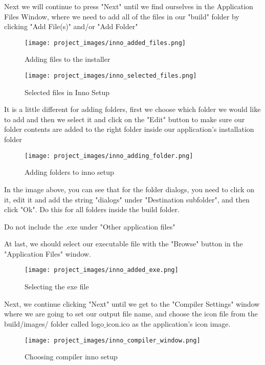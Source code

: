 	Next we will continue to press "Next" until we find ourselves in the Application Files Window, where we need to add all of the files in our "build" folder by clicking "Add File(s)" and/or "Add Folder"

\begin{figure}[H]
\centering
\texttt{[image: project\_images/inno\_added\_files.png]}
 \caption{Adding files to the installer}
 \label{fig:inno added files}
\end{figure}

\begin{figure}[H]
\centering
\texttt{[image: project\_images/inno\_selected\_files.png]}
 \caption{Selected files in Inno Setup}
 \label{fig:inno selected files}
\end{figure}
	
	It is a little different for adding folders, first we choose which folder we would like to add and then we select it and click on the "Edit" button to make sure our folder contents are added to the right folder inside our application's installation folder

\begin{figure}[H]
\centering
\texttt{[image: project\_images/inno\_adding\_folder.png]}
 \caption{Adding folders to inno setup}
 \label{fig:inno adding folder}
\end{figure}

	In the image above, you can see that for the folder dialogs, you need to click on it, edit it and add the string "dialogs" under "Destination subfolder", and then click "Ok". Do this for all folders inside the build folder.

	Do not include the .exe under "Other application files"

	At last, we should select our executable file with the "Browse" button in the "Application Files" window.

\begin{figure}[H]
\centering
\texttt{[image: project\_images/inno\_added\_exe.png]}
 \caption{Selecting the exe file}
 \label{fig:inno added exe}
\end{figure}

	Next, we continue clicking "Next" until we get to the "Compiler Settings" window where we are going to set our output file name, and choose the icon file from the build/images/ folder called logo$\_$icon.ico as the application's icon image.

\begin{figure}[H]
\centering
\texttt{[image: project\_images/inno\_compiler\_window.png]}
 \caption{Choosing compiler inno setup}
 \label{fig:inno compiler window}
\end{figure}

